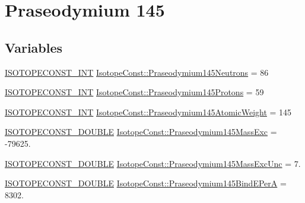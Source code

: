 \hypertarget{group___isotope_const-_praseodymium-_pr145}{}\section{Praseodymium 145}
\label{group___isotope_const-_praseodymium-_pr145}
\subsection*{Variables}
\begin{DoxyCompactItemize}
\item 
\mbox{\hyperlink{group___isotope_const-_macros_ga5f18360b3e99483a35c32d789e62621c}{I\+S\+O\+T\+O\+P\+E\+C\+O\+N\+S\+T\+\_\+\+I\+NT}} \mbox{\hyperlink{group___isotope_const-_praseodymium-_pr145_gab7121b5d91eacb9b23828d2bd9f17d86}{Isotope\+Const\+::\+Praseodymium145\+Neutrons}} = 86
\item 
\mbox{\hyperlink{group___isotope_const-_macros_ga5f18360b3e99483a35c32d789e62621c}{I\+S\+O\+T\+O\+P\+E\+C\+O\+N\+S\+T\+\_\+\+I\+NT}} \mbox{\hyperlink{group___isotope_const-_praseodymium-_pr145_ga0b268dd7fa0b596b72338a12ac925892}{Isotope\+Const\+::\+Praseodymium145\+Protons}} = 59
\item 
\mbox{\hyperlink{group___isotope_const-_macros_ga5f18360b3e99483a35c32d789e62621c}{I\+S\+O\+T\+O\+P\+E\+C\+O\+N\+S\+T\+\_\+\+I\+NT}} \mbox{\hyperlink{group___isotope_const-_praseodymium-_pr145_gad599086dcdd8a4f5232b07113a470022}{Isotope\+Const\+::\+Praseodymium145\+Atomic\+Weight}} = 145
\item 
\mbox{\hyperlink{group___isotope_const-_macros_ga8f45a7272ce02c0b4c65c44636ed719a}{I\+S\+O\+T\+O\+P\+E\+C\+O\+N\+S\+T\+\_\+\+D\+O\+U\+B\+LE}} \mbox{\hyperlink{group___isotope_const-_praseodymium-_pr145_ga10ca8801e1d6dd273afd608e6f4e02cb}{Isotope\+Const\+::\+Praseodymium145\+Mass\+Exc}} = -\/79625.
\item 
\mbox{\hyperlink{group___isotope_const-_macros_ga8f45a7272ce02c0b4c65c44636ed719a}{I\+S\+O\+T\+O\+P\+E\+C\+O\+N\+S\+T\+\_\+\+D\+O\+U\+B\+LE}} \mbox{\hyperlink{group___isotope_const-_praseodymium-_pr145_gac4b686508cbcc2658f827d3a493f5bb8}{Isotope\+Const\+::\+Praseodymium145\+Mass\+Exc\+Unc}} = 7.
\item 
\mbox{\hyperlink{group___isotope_const-_macros_ga8f45a7272ce02c0b4c65c44636ed719a}{I\+S\+O\+T\+O\+P\+E\+C\+O\+N\+S\+T\+\_\+\+D\+O\+U\+B\+LE}} \mbox{\hyperlink{group___isotope_const-_praseodymium-_pr145_gab7530400611f59ec10285e67d3c6d076}{Isotope\+Const\+::\+Praseodymium145\+Bind\+E\+PerA}} = 8302.

\end{DoxyCompactItemize}
